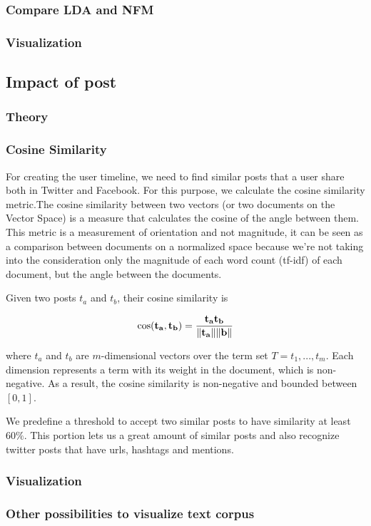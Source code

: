 \subsubsection{Compare LDA and NFM}

\subsubsection{Visualization}


\subsection{Impact of post}
\subsubsection{Theory}

\subsubsection{Cosine Similarity}

For creating the user timeline, we need to find similar posts that a user share both in Twitter and Facebook. For this purpose, we calculate the cosine similarity metric.The cosine similarity \cite{similarity} between two vectors (or two documents on the Vector Space) is a measure that calculates the cosine of the angle between them. This metric is a measurement of orientation and not magnitude, it can be seen as a comparison between documents on a normalized space because we’re not taking into the consideration only the magnitude of each word count (tf-idf) of each document, but the angle between the documents. 

Given two posts $t_{a}$ and $t_{b}$, their cosine similarity is

\begin{equation}
\cos ({\bf t_{a}},{\bf t_{b}})= {{\bf t_{a}} {\bf t_{b}} \over \|{\bf t_{a}}\| \|{\bf \textbf{b}}\|} 
\end{equation}

where  $t_{a}$ and $t_{b}$ are $m$-dimensional vectors over the term set
$T = {t_{1}, . . . , t_{m}}$. Each dimension represents a term with its
weight in the document, which is non-negative. As a result, the cosine similarity 
is non-negative and bounded between $[0,1]$. 

We predefine a threshold to accept two similar posts to have similarity at least $60\%$. This portion lets us a great amount of similar posts and also recognize twitter posts that have urls, hashtags and mentions.



\subsubsection{Visualization}
\subsubsection{Other possibilities to visualize text corpus}
